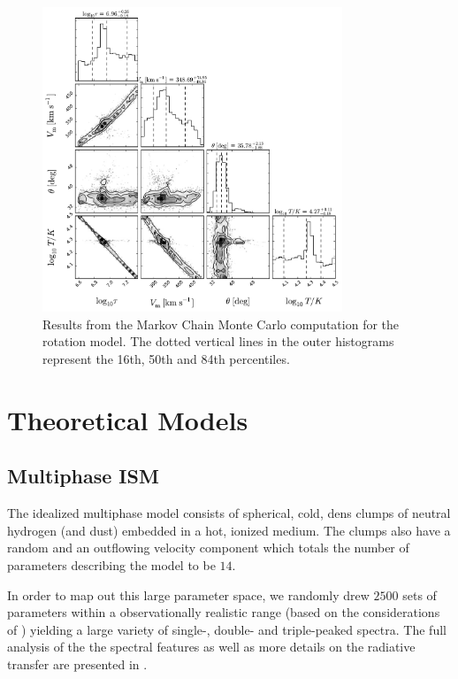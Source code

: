 \documentclass[a4,useAMS,usenatbib,usegraphicx]{mn2e}
\begin{document}
\begin{figure}
\begin{center}
\includegraphics[width=0.8\textwidth]{emcee_results.pdf}
\caption{Results from the Markov Chain Monte Carlo computation for
    the rotation model. The dotted vertical lines in the outer histograms 
	represent the 16th, 50th and 84th percentiles. \label{emceeresults}} 
\end{center}
\end{figure}


\section{Theoretical Models}


\subsection{Multiphase ISM} 

The idealized multiphase model consists of spherical, cold, dens
clumps of neutral hydrogen (and dust) embedded in a hot, ionized
medium. 
The clumps also have a random and an outflowing velocity
component which totals the number of parameters describing the model
to be $14$. 

In order to map out this large parameter space, we randomly drew
$2500$ sets of parameters within a observationally realistic range
(based on the considerations of \citep{Laursen2013ApJ...766..124L})
yielding a large variety of single-, double- and triple-peaked
spectra. 
The full analysis of the the spectral features as well as
more details on the radiative transfer are presented in
\citep{Gronke2016}.    
\end{document}
